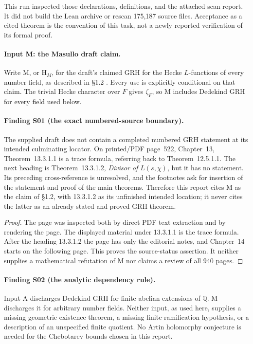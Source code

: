 This run inspected those declarations, definitions, and the attached
scan report. It did not build the Lean archive or rescan 175,187
source files. Acceptance as a cited theorem is the convention of
this task, not a newly reported verification of its formal proof.

\paragraph{Input M: the Masullo draft claim.}
Write M, or $\mathrm H_M$, for the draft's claimed GRH for the Hecke
$L$-functions of every number field, as described in \S1.2
\cite{Masullo}. Every use is explicitly conditional on that claim.
The trivial Hecke character over $F$ gives $\zeta_F$, so M includes
Dedekind GRH for every field used below.

\paragraph{Finding S01 (the exact numbered-source boundary).}
The supplied draft does not contain a completed numbered GRH
statement at its intended culminating locator. On printed/PDF
page~522, Chapter~13, Theorem~13.3.1.1 is a trace formula, referring
back to Theorem~12.5.1.1. The next heading is
Theorem~13.3.1.2, \emph{Divisor of $L(s,\chi)$}, but it has no
statement. Its preceding cross-reference is unresolved, and the
footnotes ask for insertion of the statement and proof of the main
theorems. Therefore this report cites M as the claim of \S1.2, with
13.3.1.2 as its unfinished intended location; it never cites the
latter as an already stated and proved GRH theorem.

\begin{proof}
The page was inspected both by direct PDF text extraction and by
rendering the page. The displayed material under 13.3.1.1 is the
trace formula. After the heading 13.3.1.2 the page has only the
editorial notes, and Chapter~14 starts on the following page.
This proves the source-status assertion. It neither supplies a
mathematical refutation of M nor claims a review of all 940 pages.
\end{proof}

\paragraph{Finding S02 (the analytic dependency rule).}
Input A discharges Dedekind GRH for finite abelian extensions of
$\mathbb Q$. M discharges it for arbitrary number fields. Neither
input, as used here, supplies a missing geometric existence theorem,
a missing finite-ramification hypothesis, or a description of an
unspecified finite quotient. No Artin holomorphy conjecture is needed
for the Chebotarev bounds chosen in this report.

